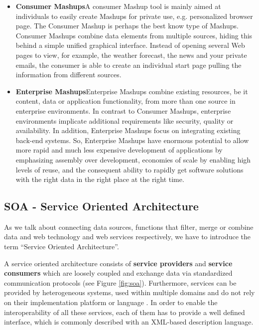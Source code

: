 \begin{itemize}
  \item \textbf{Consumer Mashups}\newline A consumer Mashup tool is mainly aimed at individuals to
  easily create Mashups for private use, e.g. personalized browser page. The Consumer Mashup is
  perhaps the best know type of Mashups. Consumer Mashups combine data elements from multiple
  sources, hiding this behind a simple unified graphical interface. Instead of opening several Web
  pages to view, for example, the weather forecast, the news and your private emails, the consumer
  is able to create an individual start page pulling the information from different sources.
  \item \textbf{Enterprise Mashups}\newline Enterprise Mashups combine existing resources, be it
  content, data or application functionality, from more than one source in enterprise environments. In contrast to
  Consumer Mashups, enterprise environments implicate additional requirements like security, quality
  or availability. In addition, Enterprise Mashups focus on integrating existing back-end systems.
  So, Enterprise Mashups have enormous potential to allow more rapid and much less expensive
  development of applications by emphasizing assembly over development, economies of scale by
  enabling high levels of reuse, and the consequent ability to rapidly get software solutions with
  the right data in the right place at the right time.
\end{itemize}

\subsection{SOA - Service Oriented Architecture}
\label{sec:service_oriented_architecture}
As we talk about connecting data sources, functions that filter, merge or combine data and web
technology and web services respectively, we have to introduce the term ``Service Oriented
Architecture''.

A service oriented architecture consists of \textbf{service providers} and \textbf{service
consumers} which are loosely coupled and exchange data via standardized communication protocols
(see Figure \ref{fig:soa}). Furthermore, services can be provided by heterogeneous systems, used
within multiple domains and do not rely on their implementation platform or language
\cite{nicolai}. In order to enable the interoperability of all these services, each of them has to
provide a well defined interface, which is commonly described with an XML-based description
language.

